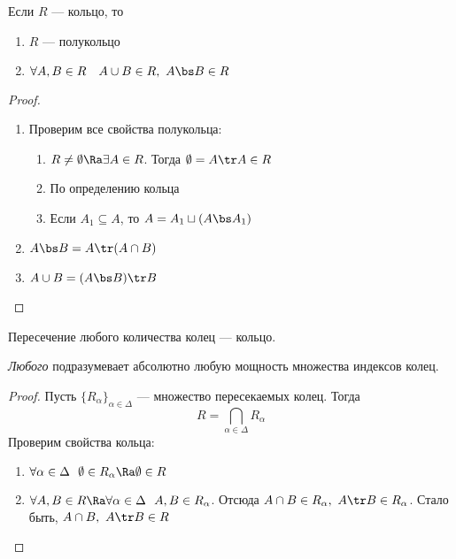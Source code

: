 \begin{theorem}
	Если $R$ --- кольцо, то
	\begin{enumerate}
		\item $R$ --- полукольцо
		
		\item \(\forall A, B \in R \quad A \cup B \in R,\ A \bs B \in R\)
	\end{enumerate}
\end{theorem}

\begin{proof}
	\begin{enumerate}
		\item Проверим все свойства полукольца:
		\begin{enumerate}
			\item $R \neq \emptyset \Ra \exists A \in R$. Тогда $\emptyset = A \tr A \in R$
			
			\item По определению кольца
			
			\item Если $A_1 \subseteq A$, то $A = A_1 \sqcup (A \bs A_1)$
		\end{enumerate}
	
		\item $A \bs B = A \tr (A \cap B)$
		
		\item $A \cup B = (A \bs B) \tr B$
	\end{enumerate}
\end{proof}

\begin{proposition}
	Пересечение любого количества колец --- кольцо.
\end{proposition}

\begin{note}
	\textit{Любого} подразумевает абсолютно любую мощность множества индексов колец.
\end{note}

\begin{proof}
	Пусть $\{R_\alpha\}_{\alpha \in \Delta}$ --- множество пересекаемых колец. Тогда
	\[
		R = \bigcap_{\alpha \in \Delta} R_\alpha
	\]
	Проверим свойства кольца:
	\begin{enumerate}
		\item $\forall \alpha \in \Delta\ \ \emptyset \in R_\alpha \Ra \emptyset \in R$
		
		\item $\forall A, B \in R \Ra \forall \alpha \in \Delta\ \ A, B \in R_\alpha$. Отсюда $A \cap B \in R_\alpha,\ A \tr B \in R_\alpha$. Стало быть, $A \cap B,\ A \tr B \in R$
	\end{enumerate}
\end{proof}

